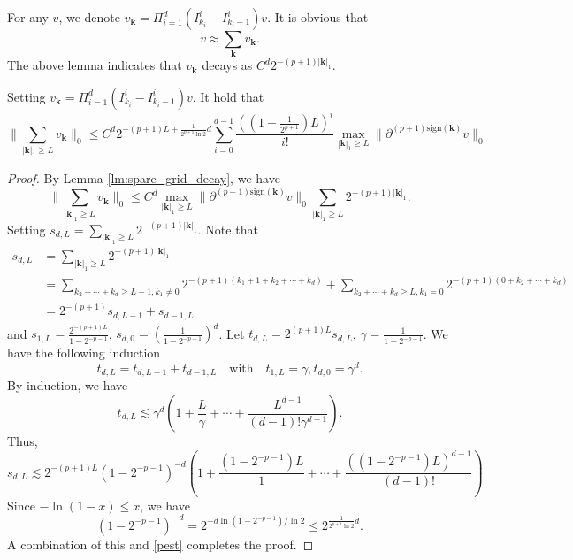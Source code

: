 For any $v$, we denote $v_{\mathbf{k}} = \Pi_{i=1}^d (I_{k_i}^i -I_{k_i-1}^i) v$. It is obvious that 
$$
v \approx \sum_{\mathbf{k} } v_{\mathbf{k}}.
$$
The above lemma indicates that  $v_{\mathbf{k}}$ decays as  $C^{d} 2^{-(p+1)|\mathbf{k}|_1}$.

\begin{lemma}
Setting  $v_{\mathbf{k}} = \Pi_{i=1}^d (I_{k_i}^i -I_{k_i-1}^i) v$. It hold that 
\begin{equation}
\|\sum_{|\mathbf{k}|_1 \ge L } v_{\mathbf{k}}\|_0 \le C^d 2^{-(p+1)L + \frac{1}{2^{p+1}\ln 2}d}\sum_{i=0}^{d-1}\frac{\left((1-\frac{1}{2^{p+1}})L\right)^{i}}{i!} \max_{|\mathbf{k}|_1\ge L}\|\partial^{(p+1)\text{sign}(\mathbf{k})} v\|_0
\end{equation}
\end{lemma}
\begin{proof}
By Lemma \ref{lm:spare_grid_decay}, we have
\begin{equation}\label{pest}
\|\sum_{|\mathbf{k}|_1 \ge L } v_{\mathbf{k}}\|_0 \le C^d \max_{|\mathbf{k}|_1\ge L }\|\partial^{(p+1)\text{sign}(\mathbf{k})} v\|_0  \sum_{|\mathbf{k}|_1 \ge L} 2^{-(p+1)|\mathbf{k}|_1}.
\end{equation}
Setting 
$
s_{d, L} = \sum_{|\mathbf{k}|_1 \ge L} 2^{-(p+1)|\mathbf{k}|_1}.
$
Note that 
$$
\begin{aligned}
s_{d, L} &= \sum_{|\mathbf{k}|_1 \ge L} 2^{-(p+1)|\mathbf{k}|_1}\\
&= \sum_{k_2+\cdots+k_d\ge L-1, k_1\neq 0} 2^{-(p+1) (k_1+1 +k_2+\cdots+k_d)}  + \sum_{k_2+\cdots+k_d \ge L, k_1=0} 2^{-(p+1) ( 0+k_2+\cdots+k_d)}\\
& =  2^{-(p+1)} s_{d,L-1} +s_{d-1,L}
\end{aligned}
$$
and $s_{1,L} = \frac{2^{-(p+1)L}}{1 - 2^{-p-1}}$, $s_{d,0} = (\frac{1}{1 - 2^{-p-1}})^d$.  
Let $t_{d,L} = 2^{(p+1)L} s_{d,L}$, $\gamma = \frac{1}{1 - 2^{-p-1}}$. We have the following induction
$$
t_{d,L} =t_{d,L-1} +t_{d-1,L}\quad \text{with}\quad  t_{1,L} = \gamma, t_{d,0} = \gamma^d.
$$
By induction, we have
$$
t_{d,L}\lesssim \gamma^d(1 + \frac{L}{\gamma } +\cdots +\frac{ L^{d-1} }{(d-1)!\gamma^{d-1}}).
$$
Thus,
$$
s_{d,L} \lesssim 2^{-(p+1)L} (1-2^{-p-1})^{-d} (1 +\frac{(1-2^{-p-1})L}{1}+\cdots + \frac{ \left((1-2^{-p-1}) L\right)^{d-1} }{(d-1)!}  )
$$
Since $-\ln(1-x)\le x$, we have
$$
(1 - 2^{-p-1})^{-d} = 2^{-d \ln (1-2^{-p-1}) /\ln 2} \le 2^{ \frac{1}{2^{p+1}\ln 2}d}.
$$
A combination of this and \eqref{pest} completes  the proof.
\end{proof}


